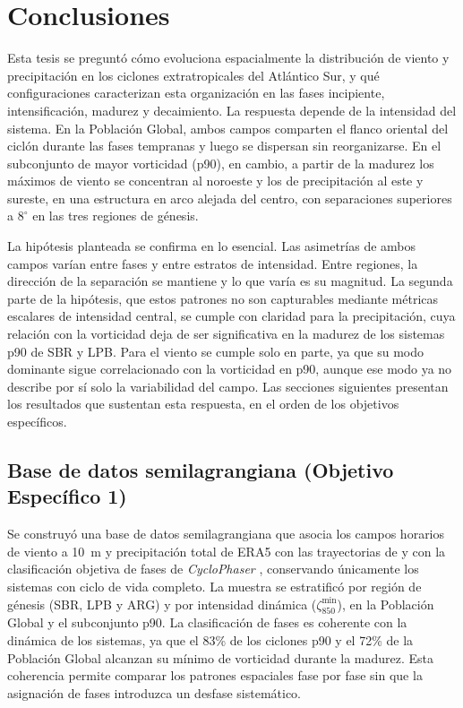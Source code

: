 \chapter{Conclusiones}\label{ch:conclusiones}

Esta tesis se preguntó cómo evoluciona espacialmente la distribución de viento y precipitación en los ciclones extratropicales del Atlántico Sur, y qué configuraciones caracterizan esta organización en las fases incipiente, intensificación, madurez y decaimiento. La respuesta depende de la intensidad del sistema. En la Población Global, ambos campos comparten el flanco oriental del ciclón durante las fases tempranas y luego se dispersan sin reorganizarse. En el subconjunto de mayor vorticidad (p90), en cambio, a partir de la madurez los máximos de viento se concentran al noroeste y los de precipitación al este y sureste, en una estructura en arco alejada del centro, con separaciones superiores a $8^{\circ}$ en las tres regiones de génesis.

La hipótesis planteada se confirma en lo esencial. Las asimetrías de ambos campos varían entre fases y entre estratos de intensidad. Entre regiones, la dirección de la separación se mantiene y lo que varía es su magnitud. La segunda parte de la hipótesis, que estos patrones no son capturables mediante métricas escalares de intensidad central, se cumple con claridad para la precipitación, cuya relación con la vorticidad deja de ser significativa en la madurez de los sistemas p90 de SBR y LPB. Para el viento se cumple solo en parte, ya que su modo dominante sigue correlacionado con la vorticidad en p90, aunque ese modo ya no describe por sí solo la variabilidad del campo. Las secciones siguientes presentan los resultados que sustentan esta respuesta, en el orden de los objetivos específicos.

\section{Base de datos semilagrangiana (Objetivo Específico 1)}

Se construyó una base de datos semilagrangiana que asocia los campos horarios de viento a 10~m y precipitación total de ERA5 con las trayectorias de \citet{gramcianinov2020analysis} y con la clasificación objetiva de fases de \textit{CycloPhaser} \citep{coutodesouza2024new, deSouza2025CycloPhaser}, conservando únicamente los sistemas con ciclo de vida completo. La muestra se estratificó por región de génesis (SBR, LPB y ARG) y por intensidad dinámica ($\zeta_{850}^{\min}$), en la Población Global y el subconjunto p90. La clasificación de fases es coherente con la dinámica de los sistemas, ya que el 83\% de los ciclones p90 y el 72\% de la Población Global alcanzan su mínimo de vorticidad durante la madurez. Esta coherencia permite comparar los patrones espaciales fase por fase sin que la asignación de fases introduzca un desfase sistemático.

